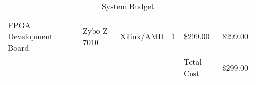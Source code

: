 \begin{table}[H]
	\begin{tabularx}{\textwidth}{| x | a | a | a | a | a |}
		\hline
		         &  &    &  &  &  \\
		\hline
		FPGA Development Board & Zybo Z-7010  & Xilinx/AMD & 1        & \$299.00        & \$299.00            \\
		\hline
		                       &              &            &          & Total Cost      & \$299.00            \\
		\hline
	\end{tabularx}
	\caption{System Budget}
\end{table}

